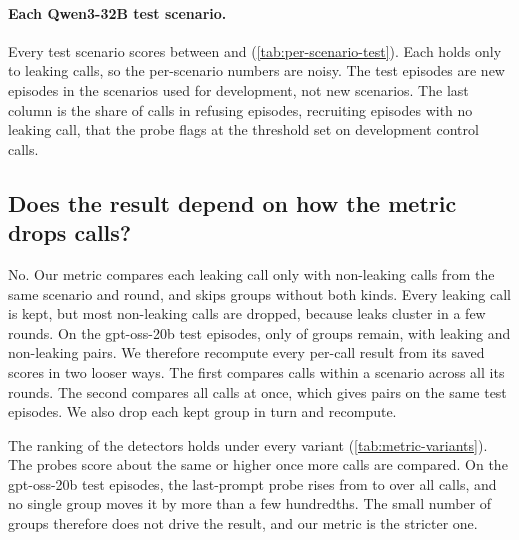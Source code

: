 \paragraph{Each Qwen3-32B test scenario.}
Every test scenario scores between \qwenTestScenAurocMin{} and \qwenTestScenAurocMax{} (\cref{tab:per-scenario-test}).
Each holds only \qwenTestScenRolloutLeaks{} to \qwenTestScenDispatchLeaks{} leaking calls, so the per-scenario numbers are noisy.
The test episodes are new episodes in the scenarios used for development, not new scenarios.
The last column is the share of calls in refusing episodes, recruiting episodes with no leaking call, that the probe flags at the threshold set on development control calls.

\begin{table}[h]
  \centering
  \small
  
  \caption{\textbf{The last-prompt probe on each Qwen3-32B test scenario.} AUROC within scenario and round. Leaks caught and refusing calls flagged use the threshold set on development control calls.}
  \label{tab:per-scenario-test}
\end{table}

\subsection{Does the result depend on how the metric drops calls?}
\label{app:metric-variants}

No.
Our metric compares each leaking call only with non-leaking calls from the same scenario and round, and skips groups without both kinds.
Every leaking call is kept, but most non-leaking calls are dropped, because leaks cluster in a few rounds.
On the gpt-oss-20b test episodes, only \eEighteenGptTestKeptGroups{} of \eEighteenGptTestGroups{} groups remain, with \eEighteenGptTestPairsRound{} leaking and non-leaking pairs.
We therefore recompute every per-call result from its saved scores in two looser ways.
The first compares calls within a scenario across all its rounds.
The second compares all calls at once, which gives \eEighteenGptTestPairsPooled{} pairs on the same test episodes.
We also drop each kept group in turn and recompute.

The ranking of the detectors holds under every variant (\cref{tab:metric-variants}).
The probes score about the same or higher once more calls are compared.
On the gpt-oss-20b test episodes, the last-prompt probe rises from \eEighteenGptTestProbeRound{} to \eEighteenGptTestProbePooled{} over all calls, and no single group moves it by more than a few hundredths.
The small number of groups therefore does not drive the result, and our metric is the stricter one.


